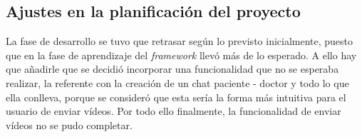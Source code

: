 \subsection{Ajustes en la planificación del proyecto}
La fase de desarrollo se tuvo que retrasar según lo previsto inicialmente, puesto que en la fase
de aprendizaje del \textit{framework} llevó más de lo esperado. A ello hay que añadirle que se
decidió incorporar una funcionalidad que no se esperaba realizar, la referente con la creación de
un chat paciente - doctor y todo lo que ella conlleva, porque se consideró que esta sería la forma
más intuitiva para el usuario de enviar vídeos. Por todo ello finalmente, la funcionalidad de
enviar vídeos no se pudo completar.